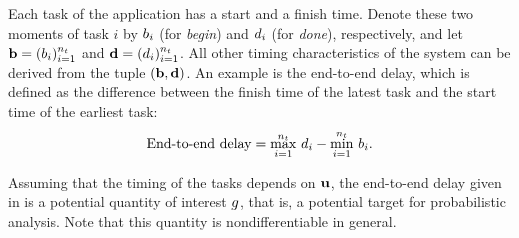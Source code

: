 Each task of the application has a start and a finish time. Denote these two
moments of task $i$ by $b_i$ (for \emph{begin}) and $d_i$ (for \emph{done}),
respectively, and let $\mathbf{b} = (b_i)_{i=1}^{n_t}$ and $\mathbf{d} = (d_i)_{i=1}^{n_t}$. All
other timing characteristics of the system can be derived from the tuple $(\mathbf{b},
\mathbf{d})$. An example is the end-to-end delay, which is defined as the difference
between the finish time of the latest task and the start time of the earliest
task:
\begin{equation} \elab{end-to-end-delay}
  \text{End-to-end delay} = \max_{i = 1}^\nt \, \d_i - \min_{i = 1}^\nt \, \b_i.
\end{equation}

Assuming that the timing of the tasks depends on $\mathbf{u}$, the end-to-end delay
given in  is a potential quantity of interest $g$, that
is, a potential target for probabilistic analysis. Note that this quantity is
nondifferentiable in general.

